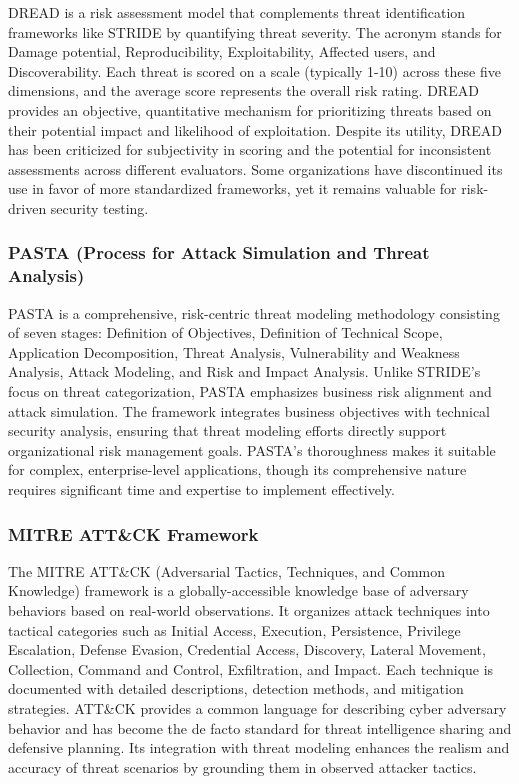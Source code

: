 \documentclass[12pt,a4paper]{report}
\begin{document}
DREAD is a risk assessment model that complements threat identification frameworks like STRIDE by quantifying threat severity. The acronym stands for Damage potential, Reproducibility, Exploitability, Affected users, and Discoverability. Each threat is scored on a scale (typically 1-10) across these five dimensions, and the average score represents the overall risk rating. DREAD provides an objective, quantitative mechanism for prioritizing threats based on their potential impact and likelihood of exploitation. Despite its utility, DREAD has been criticized for subjectivity in scoring and the potential for inconsistent assessments across different evaluators. Some organizations have discontinued its use in favor of more standardized frameworks, yet it remains valuable for risk-driven security testing.

\subsubsection{PASTA (Process for Attack Simulation and Threat Analysis)}

PASTA is a comprehensive, risk-centric threat modeling methodology consisting of seven stages: Definition of Objectives, Definition of Technical Scope, Application Decomposition, Threat Analysis, Vulnerability and Weakness Analysis, Attack Modeling, and Risk and Impact Analysis. Unlike STRIDE's focus on threat categorization, PASTA emphasizes business risk alignment and attack simulation. The framework integrates business objectives with technical security analysis, ensuring that threat modeling efforts directly support organizational risk management goals. PASTA's thoroughness makes it suitable for complex, enterprise-level applications, though its comprehensive nature requires significant time and expertise to implement effectively.

\subsubsection{MITRE ATT\&CK Framework}

The MITRE ATT\&CK (Adversarial Tactics, Techniques, and Common Knowledge) framework is a globally-accessible knowledge base of adversary behaviors based on real-world observations. It organizes attack techniques into tactical categories such as Initial Access, Execution, Persistence, Privilege Escalation, Defense Evasion, Credential Access, Discovery, Lateral Movement, Collection, Command and Control, Exfiltration, and Impact. Each technique is documented with detailed descriptions, detection methods, and mitigation strategies. ATT\&CK provides a common language for describing cyber adversary behavior and has become the de facto standard for threat intelligence sharing and defensive planning. Its integration with threat modeling enhances the realism and accuracy of threat scenarios by grounding them in observed attacker tactics.
\end{document}
